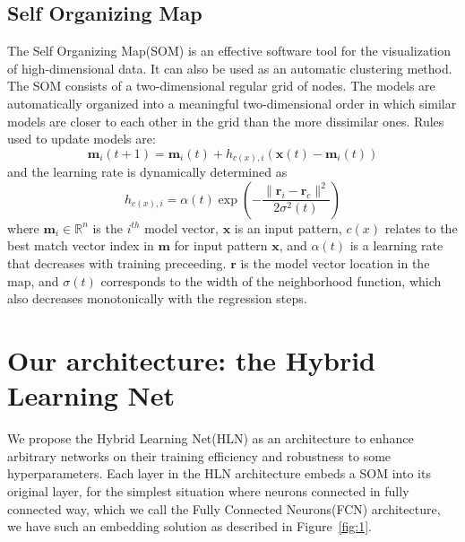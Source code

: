 \documentclass[3p,times,procedia]{elsarticle}
\begin{document}
\subsection{Self Organizing Map}
The Self Organizing Map(SOM) is an effective 
software tool for the visualization of 
high-dimensional data. It can also be used 
as an automatic clustering method. The SOM
consists of a two-dimensional regular grid
of nodes. The models are automatically 
organized into a meaningful two-dimensional
order in which similar models are closer to
each other in the grid than the more dissimilar
ones\cite{kohonen1998self}.
Rules used to update models are:
\begin{equation}
	\mathbf{m}_i(t+1)=\mathbf{m}_i(t)+
	h_{c(x),i}\left(
	\mathbf{x}(t)-\mathbf{m}_i(t)
	\right)
	\label{eq:8}
\end{equation}
and the learning rate is dynamically determined
as
\begin{equation}
	h_{c(x),i} = \alpha(t)\exp\left(
	-\frac{\|\mathbf{r}_i-\mathbf{r}_c\|^2}
	{2\sigma^2(t)}
	\right)
	\label{eq:9}
\end{equation}
where $\mathbf{m}_i\in\mathbb{R}^n$ 
is the $i^{th}$ model vector, 
$\mathbf{x}$ is an input pattern,
$c(x)$ relates to the best match vector index
in $\mathbf{m}$ for input pattern $\mathbf{x}$,
and $\alpha(t)$ is a learning rate that 
decreases with training preceeding.
$\mathbf{r}$ is the model vector location in 
the map, and $\sigma(t)$ corresponds to the 
width of the neighborhood function, which 
also decreases monotonically with the 
regression steps.

\section{Our architecture: 
the Hybrid Learning Net}
We propose the Hybrid Learning Net(HLN) as
an architecture to enhance arbitrary networks
on their training efficiency and robustness 
to some hyperparameters.
Each layer in the HLN architecture embeds a
SOM into its original layer, for the simplest
situation where neurons connected in fully
connected way, which we call the Fully 
Connected Neurons(FCN) architecture, we have 
such an embedding solution as described in 
Figure~\ref{fig:1}.
\end{document}
